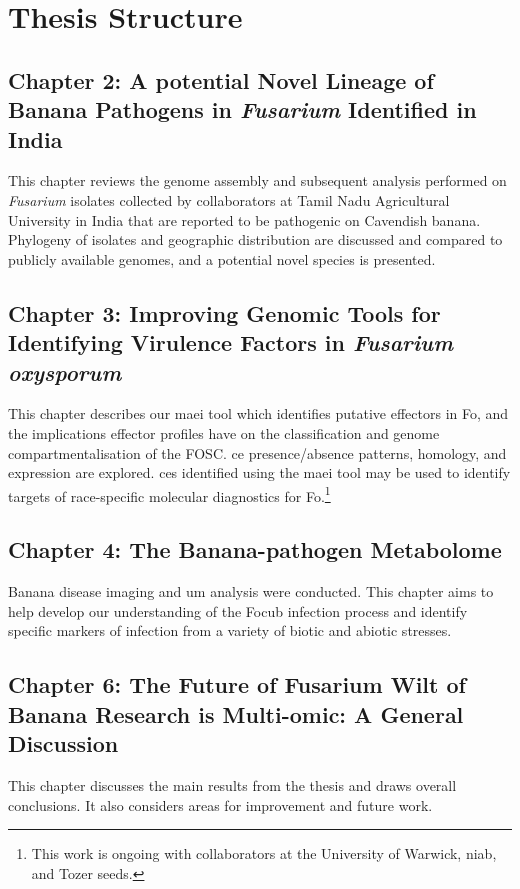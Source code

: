 \newpage
\section{Thesis Structure}

\subsection{Chapter 2: A potential Novel Lineage of Banana Pathogens in \textit{Fusarium} Identified in India} 

This chapter reviews the genome assembly and subsequent analysis performed on \textit{Fusarium} isolates collected by collaborators at Tamil Nadu Agricultural University in India that are reported to be pathogenic on Cavendish banana. Phylogeny of isolates and geographic distribution are discussed and compared to publicly available genomes, and a potential novel species is presented. 

\subsection{Chapter 3: Improving Genomic Tools for Identifying Virulence Factors in \textit{Fusarium oxysporum}} 

This chapter describes our \acf{maei} tool which identifies putative effectors in \acl{Fo}, and the implications effector profiles have on the classification and genome compartmentalisation of the FOSC. \Acl{ce} presence/absence patterns, homology, and expression are explored. \Acp{ce} identified using the \ac{maei} tool may be used to identify targets of race-specific molecular diagnostics for \acl{Fo}.\footnote{This work is ongoing with collaborators at the University of Warwick, \ac{niab}, and Tozer seeds.} 

\subsection{Chapter 4: The Banana-pathogen Metabolome}

Banana disease imaging and \acl{um} analysis were conducted. This chapter
aims to help develop our understanding of the \acl{Focub} infection process and identify specific markers of infection from a variety of biotic and abiotic stresses. 

\subsection{Chapter 6: The Future of Fusarium Wilt of Banana Research is Multi-omic: A General Discussion}
This chapter discusses the main results from the thesis and draws overall conclusions. It also considers areas for improvement and future work. 


 

 



 



 



 